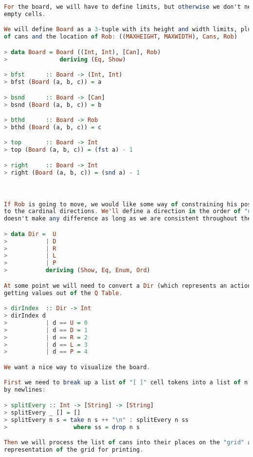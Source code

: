 \documentclass[12pt,a4paper]{article}
\begin{document}
\begin{lstlisting}[language=Haskell,numbers=none,basicstyle=\tiny]
For the board, we will have to define limits, but otherwise we don't need to store 
empty cells.

We will define Board as a 3-tuple with its height and width limits, plus a list
of cans and the location of Rob: ((MAXHEIGHT, MAXWIDTH), Cans, Rob)

> data Board = Board ((Int, Int), [Can], Rob)
>               deriving (Eq, Show)

> bfst      :: Board -> (Int, Int)
> bfst (Board (a, b, c)) = a

> bsnd      :: Board -> [Can]
> bsnd (Board (a, b, c)) = b

> bthd      :: Board -> Rob
> bthd (Board (a, b, c)) = c

> top       :: Board -> Int
> top (Board (a, b, c)) = (fst a) - 1

> right     :: Board -> Int
> right (Board (a, b, c)) = (snd a) - 1



If Rob is going to move, we would like some way of constraining his possible movements
to the cardinal directions. We'll define a direction in the order of "nsew", though it 
doesn't make any difference as long as we are consistent throughout the program.

> data Dir =  U
>           | D
>           | R
>           | L
>           | P
>           deriving (Show, Eq, Enum, Ord)

At some point we will need to convert a Dir (which represents an action) to an index for
getting values out of the Q Table.

> dirIndex  :: Dir -> Int
> dirIndex d
>           | d == U = 0
>           | d == D = 1
>           | d == R = 2
>           | d == L = 3
>           | d == P = 4

We want a nice way to visualize the board.

First we need to break up a list of "[ ]" cell tokens into a list of n cell tokens, delimited
by newlines:

> splitEvery :: Int -> [String] -> [String]
> splitEvery _ [] = []
> splitEvery n s = take n s ++ "\n" : splitEvery n ss
>                   where ss = drop n s

Then we will process the list of cans into their places on the "grid" and build a graphical
representation of the grid for printing.


\end{lstlisting}
\end{document}
